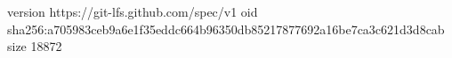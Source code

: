 version https://git-lfs.github.com/spec/v1
oid sha256:a705983ceb9a6e1f35eddc664b96350db85217877692a16be7ca3c621d3d8cab
size 18872
